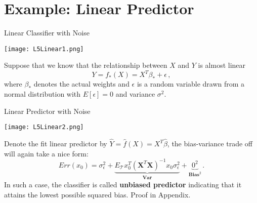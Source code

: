\documentclass[10pt, table, dvipsnames,handout]{beamer}
\newcommand{\cT}{\ensuremath{\mathcal{T}}}
\begin{document}
\section{Example: Linear Predictor}

\begin{frame}[fragile]{Linear Classifier with Noise}
  \begin{minipage}[t][0.5\textheight][t]{\textwidth}
	  \centering \texttt{[image: L5Linear1.png]}
  \end{minipage}
  \vfill
  \begin{minipage}[t][0.5\textheight][t]{\textwidth}
Suppose that we know that the relationship between $X$ and $Y$ is almost linear
$$
Y = f_*(X) = X^T\beta_* + \epsilon\,,
$$\pause
where $\beta_*$ denotes the actual weights and $\epsilon$ is a random variable drawn from a normal distribution with $E[\epsilon] = 0$ and variance $\sigma^2$.
\end{minipage}
\end{frame}








\begin{frame}[fragile]{Linear Predictor with Noise}
  \begin{minipage}[t][0.5\textheight][t]{\textwidth}
	  \centering \texttt{[image: L5Linear2.png]}
  \end{minipage}
  \vfill
  \begin{minipage}[t][0.5\textheight][t]{\textwidth}
Denote the fit linear predictor by $\hat{Y} = \hat{f}(X) = X^T\hat{\beta}$, the bias-variance trade off will again take a nice form:
$$
Err(x_0) = \sigma_\epsilon^2 + \underbrace{E_\cT x_0^T(\mathbf{X}^T\mathbf{X})^{-1} x_0 \sigma_\epsilon^2}_{\textbf{Var}} + \underbrace{0^2}_{\textbf{Bias}^2}\,.
$$\pause
In such a case, the classifier is called \textbf{unbiased predictor} indicating that it attains the lowest possible squared bias. Proof in Appendix. 
\end{minipage}
\end{frame}
\end{document}
